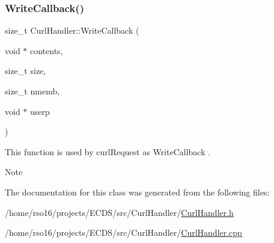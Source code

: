 \subsubsection{\texorpdfstring{Write\+Callback()}{WriteCallback()}}
{\footnotesize\ttfamily size\+\_\+t Curl\+Handler\+::\+Write\+Callback (\begin{DoxyParamCaption}\item[{void $\ast$}]{contents,  }\item[{size\+\_\+t}]{size,  }\item[{size\+\_\+t}]{nmemb,  }\item[{void $\ast$}]{userp }\end{DoxyParamCaption})\hspace{0.3cm}{\ttfamily [static]}}



This function is used by curl\+Request as Write\+Callback . 

\begin{DoxyNote}{Note}

\end{DoxyNote}


The documentation for this class was generated from the following files\+:\begin{DoxyCompactItemize}
\item 
/home/rso16/projects/\+E\+C\+D\+S/src/\+Curl\+Handler/\hyperlink{CurlHandler_8h}{Curl\+Handler.\+h}\item 
/home/rso16/projects/\+E\+C\+D\+S/src/\+Curl\+Handler/\hyperlink{CurlHandler_8cpp}{Curl\+Handler.\+cpp}\end{DoxyCompactItemize}
